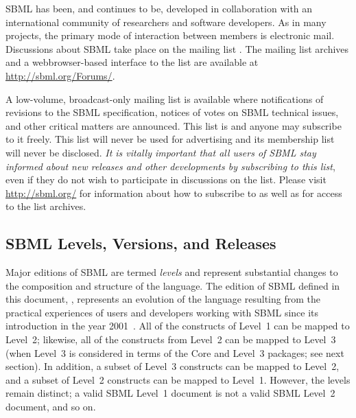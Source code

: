 SBML has been, and continues to be, developed in collaboration
with an international community of researchers and software
developers.  As in many projects, the primary mode of interaction
between members is electronic mail.  Discussions about SBML take
place on the mailing list
.  The
mailing list archives and a web\changed{-}browser-based interface to the
list are available at \url{http://sbml.org/Forums/}.

A low-volume, broadcast-only mailing list is available 
where notifications of
revisions to the SBML speci\-fication, notices of votes on SBML
technical issues, and other critical matters are announced.  This
list is 
and anyone may subscribe to it freely.  This list will never be
used for advertising and its membership list will never be
disclosed.  \emph{It is vitally important that all users of SBML
  stay informed about new releases and other developments by
  subscribing to this list}, even if they do not wish to
participate in discussions on the
 list.
Please visit \url{http://sbml.org/}
for information about how to subscribe to
 as well
as for access to the list archives.


\subsection{SBML Levels, Versions, and Releases}
\label{sec:levels-versions-releases}

Major editions of SBML are termed \emph{levels} and represent
substantial changes to the composition and structure of the
language.  The edition of SBML defined in this document,
\sbmlthree, represents an evolution of the language resulting from
the practical experiences of users and developers working with
SBML since its introduction in the year
2001~\citep{hucka:2001,hucka:2003}.  All of the constructs of
Level~1 can be mapped to Level~2; likewise, all of the constructs
from Level~2 can be mapped to Level~3 (when Level~3 is considered
in terms of the Core and Level~3 packages; see next section).  In
addition, a subset of Level~3 constructs can be mapped to Level~2,
and a subset of Level~2 constructs can be mapped to Level~1.
However, the levels remain distinct; a valid SBML Level~1 document
is not a valid SBML Level~2 document, and so on.

